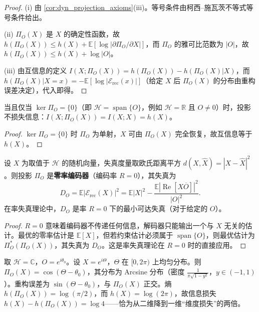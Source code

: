 \begin{proof}
(i) 由 \cref{cor:dyn_projection_axioms}(iii)。等号条件由柯西–施瓦茨不等式等号条件给出。

(ii) $\Pi_O(X)$ 是 $X$ 的确定性函数，故 $h(\Pi_O(X))\le h(X)+\mathbb E[\log|\partial\Pi_O/\partial X|]$，而 $\Pi_O$ 的雅可比范数为 $|O|$，故 $h(\Pi_O(X))\le h(X)+\log|O|$。

(iii) 由互信息的定义 $I(X;\Pi_O(X))=h(\Pi_O(X))-h(\Pi_O(X)|X)$，而 $h(\Pi_O(X)|X=x)=-\mathbb E[\log|\mathcal E_{\text{rec}}(x)|]$（给定 $X$ 后 $\Pi_O(X)$ 的分布由重构误差决定），代入即得。
\end{proof}

\begin{corollary}[理想观察者不损失信息]\label{cor:dyn_ideal_observer}
当且仅当 $\ker\Pi_O=\{0\}$（即 $\mathcal H=\operatorname{span}\{O\}$，例如 $\mathcal H=\mathbb R$ 且 $O\neq 0$）时，投影不损失信息：$I(X;\Pi_O(X))=I(X;X)=h(X)$。
\end{corollary}

\begin{proof}
$\ker\Pi_O=\{0\}$ 时 $\Pi_O$ 为单射，$X$ 可由 $\Pi_O(X)$ 完全恢复，故互信息等于 $h(X)$。
\end{proof}

\begin{theorem}[率失真视角下的投影]\label{thm:dyn_projection_rate_distortion}
设 $X$ 为取值于 $\mathcal H$ 的随机向量，失真度量取欧氏距离平方 $d(X,\widehat X)=|X-\widehat X|^2$。则投影 $\Pi_O$ 是\textbf{零率编码器}（编码率 $R=0$），其失真为
\[
D_O=\mathbb E|\mathcal E_{\text{rec}}(X)|^2=\mathbb E|X|^2-\frac{\mathbb E|\operatorname{Re}[X\overline O]|^2}{|O|^2}.
\]
在率失真理论中，$D_O$ 是率 $R=0$ 下的最小可达失真（对于给定的 $O$）。
\end{theorem}

\begin{proof}
$R=0$ 意味着编码器不传递任何信息，解码器只能输出一个与 $X$ 无关的估计。最优的零率估计是 $\mathbb E[X]$，但若约束估计必须属于 $\operatorname{span}\{O\}$，则最优估计为 $\Pi_O^\ast(\Pi_O(X))$，其失真为 $D_O$。这是率失真理论在 $R=0$ 时的直接应用。
\end{proof}

\begin{example}[$S^1$ 上均匀分布源的单方向投影]\label{ex:dyn_uniform_projection}
取 $\mathcal H=\mathbb C$，$O=e^{i\theta_0}$。设 $X=e^{i\Theta}$，$\Theta$ 在 $[0,2\pi)$ 上均匀分布。则 $\Pi_O(X)=\cos(\Theta-\theta_0)$，其分布为 Arcsine 分布（密度 $\frac{1}{\pi\sqrt{1-y^2}}$，$y\in(-1,1)$）。重构误差为 $\sin(\Theta-\theta_0)$，与 $\Pi_O(X)$ 正交。熵 $h(\Pi_O(X))=\log(\pi/2)$，而 $h(X)=\log(2\pi)$，故信息损失 $h(X)-h(\Pi_O(X))=\log 4$——恰为从二维降到一维“维度损失”的两倍。
\end{example}

